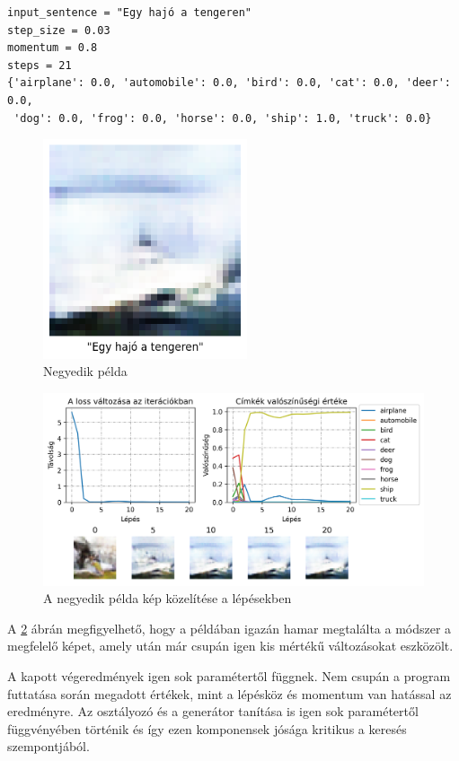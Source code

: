 \begin{verbatim}
input_sentence = "Egy hajó a tengeren"
step_size = 0.03
momentum = 0.8
steps = 21
{'airplane': 0.0, 'automobile': 0.0, 'bird': 0.0, 'cat': 0.0, 'deer': 0.0,
 'dog': 0.0, 'frog': 0.0, 'horse': 0.0, 'ship': 1.0, 'truck': 0.0}
\end{verbatim}

\begin{figure}[h]
	\centering
	\includegraphics[width=6cm]{images/demo04.png}
	\caption{Negyedik példa}
	\label{fig:demo4}
\end{figure}

\begin{figure}[h]
	\centering
	\includegraphics[width=15cm]{images/demo04_conv.png}
	\caption{A negyedik példa kép közelítése a lépésekben}
	\label{fig:demo4_convergence}
\end{figure}

A \ref{fig:demo4_convergence} ábrán megfigyelhető, hogy a példában igazán hamar megtalálta a módszer a megfelelő képet, amely után már csupán igen kis mértékű változásokat eszközölt.

A kapott végeredmények igen sok paramétertől függnek. Nem csupán a program futtatása során megadott értékek, mint a lépésköz és momentum van hatással az eredményre. Az osztályozó és a generátor tanítása is igen sok paramétertől függvényében történik és így ezen komponensek jósága kritikus a keresés szempontjából.